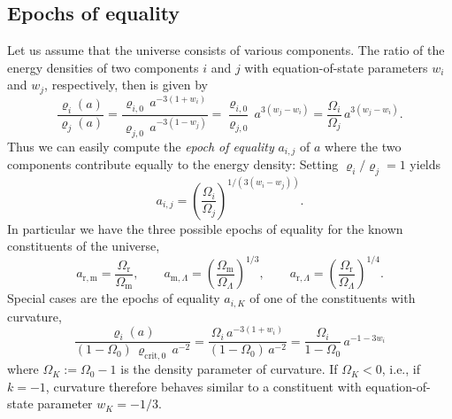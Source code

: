 \subsection{Epochs of equality}
\label{sec:epochs-of-equality}
Let us assume that the universe consists of various components.
The ratio of the energy densities of two components $i$ and $j$ with equation-of-state parameters $w_i$ and $w_j$, respectively, then is given by
\begin{equation}
	\frac{\varrho_{i}(a)}{\varrho_{j}(a)}
	= \frac{\varrho_{i,0} \, a^{-3(1+w_i)}}{\varrho_{j,0} \, a^{-3(1-w_j)}}
	= \frac{\varrho_{i,0}}{\varrho_{j,0}} \, a^{3(w_j - w_i)}
	= \frac{\Omega_i}{\Omega_j} \, a^{3(w_j - w_i)}
	.
\end{equation}
Thus we can easily compute the \emph{epoch of equality} \cite[47]{Dodelson-Schmidt-2025} $a_{i,j}$ of $a$ where the two components contribute equally to the energy density: Setting ${\varrho_{i}}/{\varrho_{j}} = 1$ yields
\begin{equation}
	a_{i,j}
	= \left(\frac{\Omega_{i}}{\Omega_{j}}\right)^{1/(3(w_i - w_j))}
	.
\end{equation}
In particular we have the three possible epochs of equality for the known constituents of the universe,
\begin{equation}
	a_{\mathrm{r,m}}
	= \frac{\Omega_{\mathrm{r}}}{\Omega_{\mathrm{m}}}
	,
	\qquad
	a_{\mathrm{m}, \Lambda}
	= \left(\frac{\Omega_{\mathrm{m}}}{\Omega_{\Lambda}}\right)^{1/3}
	, \qquad
	a_{\mathrm{r}, \Lambda}
	= \left(\frac{\Omega_{\mathrm{r}}}{\Omega_{\Lambda}}\right)^{1/4}
	.
\end{equation}
Special cases are the epochs of equality $a_{i,K}$ of one of the constituents with curvature,
\begin{equation}
	\frac{\varrho_{i}(a)}{(1-\Omega_0) \, \varrho_{\mathrm{crit}, 0} \, a^{-2}}
	= \frac{\Omega_i \, a^{-3(1+w_i)}}{(1-\Omega_0) \, a^{-2}}
	= \frac{\Omega_i}{1-\Omega_0} \,  a^{- 1 - 3w_i} 
\end{equation}
where $\Omega_{K} := \Omega_0 - 1$ is the density parameter of curvature.
If  $\Omega_{K} < 0$, i.e., if $k = -1$,
curvature therefore behaves similar to a constituent with equation-of-state parameter $w_{K} = -1/3$.
